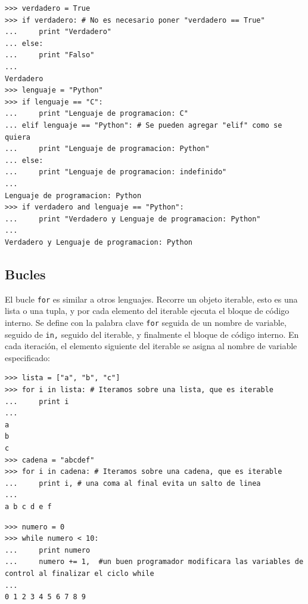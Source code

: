 \begin{lstlisting}
>>> verdadero = True
>>> if verdadero: # No es necesario poner "verdadero == True"
...     print "Verdadero"
... else:
...     print "Falso"
...
Verdadero
>>> lenguaje = "Python"
>>> if lenguaje == "C": 
...     print "Lenguaje de programacion: C"
... elif lenguaje == "Python": # Se pueden agregar "elif" como se quiera
...     print "Lenguaje de programacion: Python"
... else: 
...     print "Lenguaje de programacion: indefinido"
...
Lenguaje de programacion: Python
>>> if verdadero and lenguaje == "Python": 
...     print "Verdadero y Lenguaje de programacion: Python"
...
Verdadero y Lenguaje de programacion: Python
\end{lstlisting}






\subsection{Bucles}
El bucle \verb~for~ es similar a  otros lenguajes. Recorre un objeto iterable, esto es  una lista o una tupla, y por cada elemento del iterable ejecuta el bloque de código interno. Se define con la palabra clave \verb~for~ seguida de un nombre de variable, seguido de \verb~in,~ seguido del iterable, y finalmente el bloque de código interno. En cada iteración, el elemento siguiente del iterable se asigna al nombre de variable especificado:

\begin{lstlisting}
>>> lista = ["a", "b", "c"]
>>> for i in lista: # Iteramos sobre una lista, que es iterable
...     print i
...
a
b
c
>>> cadena = "abcdef"
>>> for i in cadena: # Iteramos sobre una cadena, que es iterable
...     print i, # una coma al final evita un salto de linea
...
a b c d e f
\end{lstlisting}



\begin{lstlisting}
>>> numero = 0
>>> while numero < 10:
...     print numero
...     numero += 1,  #un buen programador modificara las variables de control al finalizar el ciclo while
...
0 1 2 3 4 5 6 7 8 9
\end{lstlisting}


% 
%  
%  
% 
% 
% 





